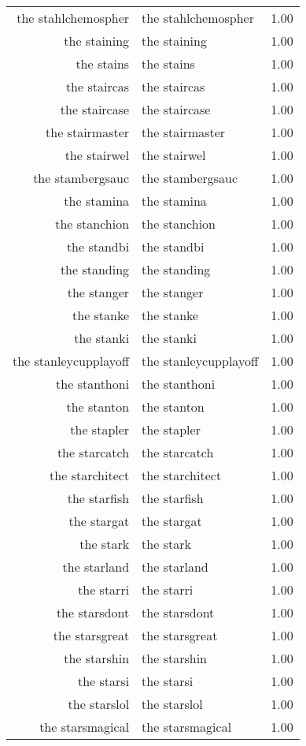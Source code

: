 \begin{table}[ht]
\begin{tabular}{rlr}
  the stahlchemospher & the stahlchemospher & 1.00 \\ 
  the staining & the staining & 1.00 \\ 
  the stains & the stains & 1.00 \\ 
  the staircas & the staircas & 1.00 \\ 
  the staircase & the staircase & 1.00 \\ 
  the stairmaster & the stairmaster & 1.00 \\ 
  the stairwel & the stairwel & 1.00 \\ 
  the stambergsauc & the stambergsauc & 1.00 \\ 
  the stamina & the stamina & 1.00 \\ 
  the stanchion & the stanchion & 1.00 \\ 
  the standbi & the standbi & 1.00 \\ 
  the standing & the standing & 1.00 \\ 
  the stanger & the stanger & 1.00 \\ 
  the stanke & the stanke & 1.00 \\ 
  the stanki & the stanki & 1.00 \\ 
  the stanleycupplayoff & the stanleycupplayoff & 1.00 \\ 
  the stanthoni & the stanthoni & 1.00 \\ 
  the stanton & the stanton & 1.00 \\ 
  the stapler & the stapler & 1.00 \\ 
  the starcatch & the starcatch & 1.00 \\ 
  the starchitect & the starchitect & 1.00 \\ 
  the starfish & the starfish & 1.00 \\ 
  the stargat & the stargat & 1.00 \\ 
  the stark & the stark & 1.00 \\ 
  the starland & the starland & 1.00 \\ 
  the starri & the starri & 1.00 \\ 
  the starsdont & the starsdont & 1.00 \\ 
  the starsgreat & the starsgreat & 1.00 \\ 
  the starshin & the starshin & 1.00 \\ 
  the starsi & the starsi & 1.00 \\ 
  the starslol & the starslol & 1.00 \\ 
  the starsmagical & the starsmagical & 1.00 \\ 

\end{tabular}
\end{table}
